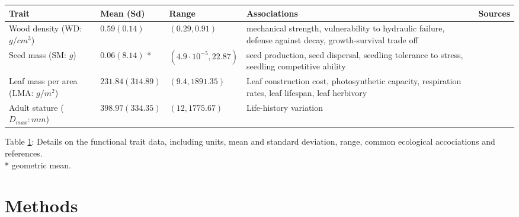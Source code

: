 \documentclass[b5paper,justified]{tufte-book} %
\begin{document}
\begin{fullwidth}
\begin{landscape}
\begin{table}
\begin{center}
\footnotesize
\vspace*{4cm}
\hspace*{5cm}
\begin{tabular}{l l l p{5cm} p{4cm}}
\hline 
Trait & Mean (Sd) & Range & Associations & Sources \\ 
\hline 
Wood density (WD: $g/cm^3$) & 

$0.59 (0.14)$ & $(0.29,0.91)$ &

mechanical strength, vulnerability to hydraulic failure, defense against decay, growth-survival trade off & \citep{Chave2009,Larjavaara2010,Anten2010} \\ 

Seed mass (SM: $g$) & 

$0.06 (8.14)$ * & $(4.9 \cdot 10^{-5},22.87)$ & 

seed production, seed dispersal, seedling tolerance to stress, seedling competitive ability & \citep{Moles2004,Westoby2002,Muller-Landau2010} \\ 

Leaf mass per area (LMA: $g/m^2$) & 

$231.84 (314.89)$ & $(9.4,1891.35)$ & 

Leaf construction cost, photosynthetic capacity, respiration rates, leaf lifespan, leaf herbivory
 & \citep{Osnas2013,Wright2004,Westoby2002} \\ 

Adult stature ($D_{max}: mm$) & 

$398.97 (334.35)$ & $(12,1775.67)$ & 

Life-history variation & \citep{Kohyama1993,Westoby2002} \\ 
\hline 
\end{tabular} 
\label{tab:chap5tab1}
\hspace*{5cm}\begin{minipage}{19cm} Table \ref{tab:chap5tab1}: Details on the functional trait data, including units, mean and standard deviation, range, common ecological accociations and references.\\
 * geometric mean. \end{minipage} 
\end{center}
\end{table}
\end{landscape}


\section{Methods}

\end{fullwidth}
\end{document}
